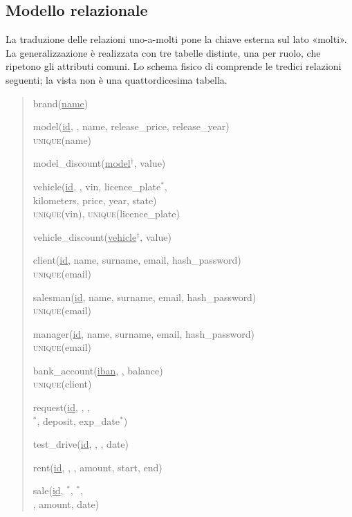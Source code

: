\subsection{Modello relazionale}\label{sec:modello-relazionale}

La traduzione delle relazioni uno-a-molti pone la chiave esterna sul lato «molti». La generalizzazione  è realizzata con tre tabelle distinte, una per ruolo, che ripetono gli attributi comuni. Lo schema fisico di  comprende le tredici relazioni seguenti; la vista  non è una quattordicesima tabella.

\begin{quote}
\ttfamily\small\raggedright
brand(\uline{name})

\smallskip
model(\uline{id}, , name, release\_price, release\_year)\\
\hspace*{2em}\textsc{unique}(name)

\smallskip
model\_discount(\uline{model}$^{\dagger}$, value)

\smallskip
vehicle(\uline{id}, , vin, licence\_plate$^{\ast}$,\\
\hspace*{2em}kilometers, price, year, state)\\
\hspace*{2em}\textsc{unique}(vin), \textsc{unique}(licence\_plate)

\smallskip
vehicle\_discount(\uline{vehicle}$^{\dagger}$, value)

\smallskip
client(\uline{id}, name, surname, email, hash\_password)\\
\hspace*{2em}\textsc{unique}(email)

\smallskip
salesman(\uline{id}, name, surname, email, hash\_password)\\
\hspace*{2em}\textsc{unique}(email)

\smallskip
manager(\uline{id}, name, surname, email, hash\_password)\\
\hspace*{2em}\textsc{unique}(email)

\smallskip
bank\_account(\uline{iban}, , balance)\\
\hspace*{2em}\textsc{unique}(client)

\smallskip
request(\uline{id}, , ,\\
\hspace*{2em}$^{\ast}$, deposit, exp\_date$^{\ast}$)

\smallskip
test\_drive(\uline{id}, , , date)

\smallskip
rent(\uline{id}, , , amount, start, end)

\smallskip
sale(\uline{id}, $^{\ast}$, $^{\ast}$,\\
\hspace*{2em}, amount, date)
\end{quote}

